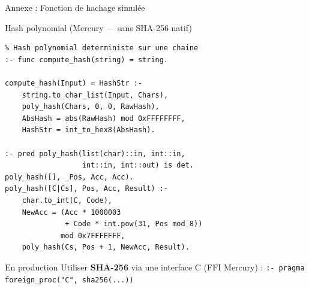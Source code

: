 \documentclass[aspectratio=169,12pt]{beamer}
\newcommand{\code}[1]{\texttt{\color{KeywordColor}#1}}
\begin{document}
\appendix

\begin{frame}[fragile]{\faTools\quad Annexe : Fonction de hachage simulée}
  \begin{exampleblock}{Hash polynomial (Mercury — sans SHA-256 natif)}
\begin{lstlisting}
% Hash polynomial deterministe sur une chaine
:- func compute_hash(string) = string.

compute_hash(Input) = HashStr :-
    string.to_char_list(Input, Chars),
    poly_hash(Chars, 0, 0, RawHash),
    AbsHash = abs(RawHash) mod 0xFFFFFFFF,
    HashStr = int_to_hex8(AbsHash).

:- pred poly_hash(list(char)::in, int::in,
                  int::in, int::out) is det.
poly_hash([], _Pos, Acc, Acc).
poly_hash([C|Cs], Pos, Acc, Result) :-
    char.to_int(C, Code),
    NewAcc = (Acc * 1000003
              + Code * int.pow(31, Pos mod 8))
             mod 0x7FFFFFFF,
    poly_hash(Cs, Pos + 1, NewAcc, Result).
\end{lstlisting}
  \end{exampleblock}
  \begin{alertblock}{En production}
    Utiliser \textbf{SHA-256} via une interface C (FFI Mercury) :
    \code{:- pragma foreign\_proc("C", sha256(...))}
  \end{alertblock}
\end{frame}
\end{document}
